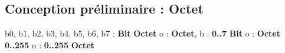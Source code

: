 \subsection{Conception préliminaire : Octet}

\begin{algorithme}
    {b0, b1, b2, b3, b4, b5, b6, b7 : \textbf{Bit}}
    {\textbf{Octet}}
    {}
    {o : \textbf{Octet}, b : \textbf{0..7}}
    {\textbf{Bit}}
    {}
    {o : \textbf{Octet}}
    {\textbf{0..255}}
    {}
    {n : \textbf{0..255}}
    {\textbf{Octet}}
    {}
\end{algorithme}
